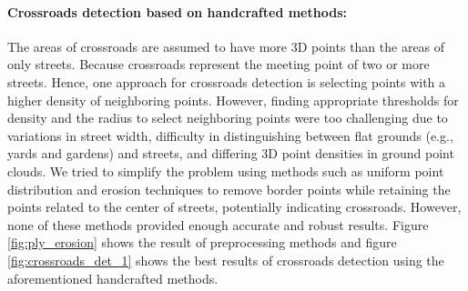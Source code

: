 \documentclass[11pt]{article}
\begin{document}
    \paragraph{Crossroads detection based on handcrafted methods:}
    The areas of crossroads are assumed to have more 3D points than the areas of only streets. Because crossroads represent
    the meeting point of two or more streets. Hence, one approach for crossroads detection is selecting points with
    a higher density of neighboring points. However, finding appropriate thresholds for density and the radius to
    select neighboring points were too challenging due to variations in street width, difficulty in distinguishing
    between flat grounds (e.g., yards and gardens) and streets, and differing 3D point densities in ground point
    clouds. We tried to simplify the problem using methods such as uniform point distribution and erosion techniques
    to remove border points while retaining the points related to the center of streets, potentially indicating
    crossroads. However, none of these methods provided enough accurate and robust results. Figure \ref{fig:ply_erosion} shows the
    result of preprocessing methods and figure \ref{fig:crossroads_det_1} shows the best results of crossroads detection using
    the aforementioned handcrafted methods.
\end{document}
